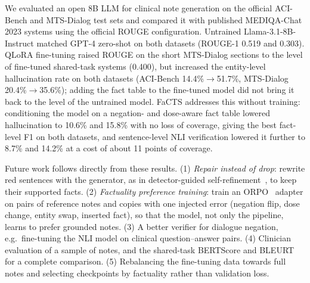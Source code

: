 We evaluated an open 8B LLM for clinical note generation on the official ACI-Bench and MTS-Dialog test sets
and compared it with published MEDIQA-Chat 2023 systems using the official ROUGE configuration. Untrained
Llama-3.1-8B-Instruct matched GPT-4 zero-shot on both datasets (ROUGE-1 0.519 and 0.303). QLoRA fine-tuning
raised ROUGE on the short MTS-Dialog sections to the level of fine-tuned shared-task systems (0.400), but
increased the entity-level hallucination rate on both datasets (ACI-Bench 14.4\%$\rightarrow$51.7\%,
MTS-Dialog 20.4\%$\rightarrow$35.6\%); adding the fact table to the fine-tuned model did not bring it back
to the level of the untrained model. FaCTS addresses this without training: conditioning the model on a
negation- and dose-aware fact table lowered hallucination to 10.6\% and 15.8\% with no loss of coverage, giving
the best fact-level F1 on both datasets, and sentence-level NLI verification lowered it further to 8.7\% and
14.2\% at a cost of about 11 points of coverage.

Future work follows directly from these results. (1) \emph{Repair instead of drop}: rewrite red sentences
with the generator, as in detector-guided self-refinement~\cite{seethakantha2026hdsr}, to keep their
supported facts. (2) \emph{Factuality preference training}: train an ORPO~\cite{hong2024orpo} adapter on pairs
of reference notes and copies with one injected error (negation flip, dose change, entity swap, inserted
fact), so that the model, not only the pipeline, learns to prefer grounded notes. (3) A better verifier for
dialogue negation, e.g.\ fine-tuning the NLI model on clinical question--answer pairs. (4) Clinician
evaluation of a sample of notes, and the shared-task BERTScore and BLEURT for a complete comparison.
(5) Rebalancing the fine-tuning data towards full notes and selecting checkpoints by factuality rather than
validation loss.
